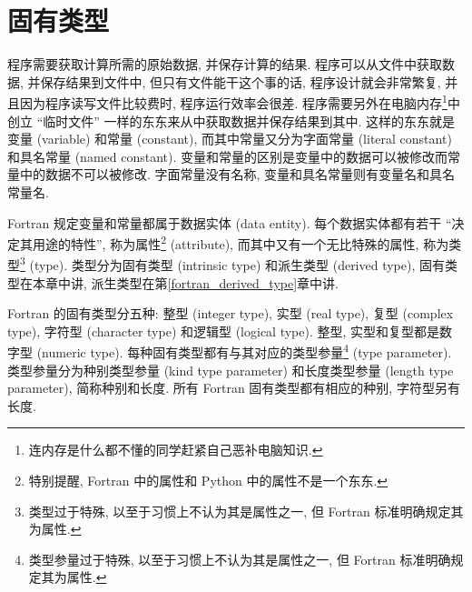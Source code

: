 \chapter{固有类型}\label{fortran_intrinsic_type}

程序需要获取计算所需的原始数据, 并保存计算的结果. 程序可以从文件中获取数据, 并保存结果到文件中, 但只有文件能干这个事的话, 程序设计就会非常繁复, 并且因为程序读写文件比较费时, 程序运行效率会很差. 程序需要另外在电脑内存\footnote{连内存是什么都不懂的同学赶紧自己恶补电脑知识.}中创立 ``临时文件'' 一样的东东来从中获取数据并保存结果到其中. 这样的东东就是变量 (variable) 和常量 (constant), 而其中常量又分为字面常量 (literal constant) 和具名常量 (named constant). 变量和常量的区别是变量中的数据可以被修改而常量中的数据不可以被修改. 字面常量没有名称, 变量和具名常量则有变量名和具名常量名.

Fortran 规定变量和常量都属于数据实体 (data entity). 每个数据实体都有若干 ``决定其用途的特性'', 称为属性\footnote{特别提醒, Fortran 中的属性和 Python 中的属性不是一个东东.} (attribute), 而其中又有一个无比特殊的属性, 称为类型\footnote{类型过于特殊, 以至于习惯上不认为其是属性之一, 但 Fortran 标准明确规定其为属性.} (type). 类型分为固有类型 (intrinsic type) 和派生类型 (derived type), 固有类型在本章中讲, 派生类型在第\ref{fortran_derived_type}章中讲.

Fortran 的固有类型分五种: 整型 (integer type), 实型 (real type), 复型 (complex type), 字符型 (character type) 和逻辑型 (logical type). 整型, 实型和复型都是数字型 (numeric type). 每种固有类型都有与其对应的类型参量\footnote{类型参量过于特殊, 以至于习惯上不认为其是属性之一, 但 Fortran 标准明确规定其为属性.} (type parameter). 类型参量分为种别类型参量 (kind type parameter) 和长度类型参量 (length type parameter), 简称种别和长度. 所有 Fortran 固有类型都有相应的种别, 字符型另有长度.

